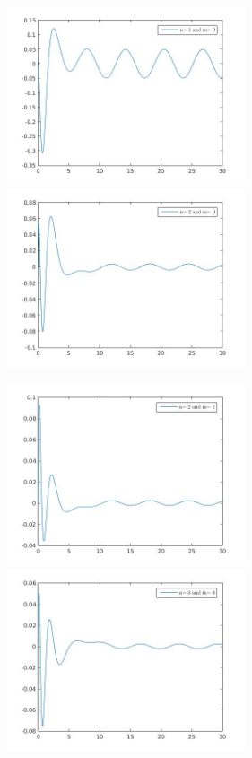 \documentclass{article}
\begin{document}
 \begin{figure}[h!]
\centering 
 	  \begin{minipage}{0.48\textwidth}
     \centering
     \advance\leftskip-2cm
  \includegraphics[width=70mm,scale=2]{assets/try10.jpg}
   \end{minipage} \hfill
    \begin{minipage}{0.48\textwidth}
  \includegraphics[width=70mm,scale=2]{assets/try20.jpg}
  \end{minipage}
\end{figure}
 \begin{figure}[h!]
\centering 
 	  \begin{minipage}{0.48\textwidth}
     \centering
     \advance\leftskip-2cm
  \includegraphics[width=70mm,scale=2]{assets/try21.jpg}
   \end{minipage} \hfill
    \begin{minipage}{0.48\textwidth}
  \includegraphics[width=70mm,scale=2]{assets/try30.jpg}
  \end{minipage}
\end{figure}
\end{document}
